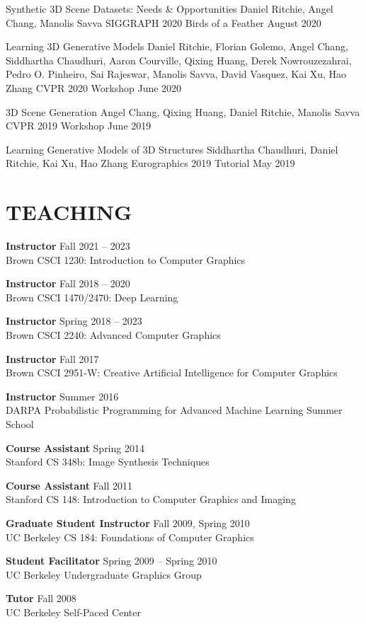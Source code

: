 \documentclass[line,margin]{res}
\begin{document}
\begin{resume}
\workshop
{Synthetic 3D Scene Datasets: Needs \& Opportunities}
{Daniel Ritchie, Angel Chang, Manolis Savva}
{SIGGRAPH 2020 Birds of a Feather}
{August 2020}

\workshop
{Learning 3D Generative Models}
{Daniel Ritchie, Florian Golemo, Angel Chang, Siddhartha Chaudhuri, Aaron Courville, Qixing Huang, Derek Nowrouzezahrai, Pedro O. Pinheiro, Sai Rajeswar, Manolis Savva, David Vasquez, Kai Xu, Hao Zhang}
{CVPR 2020 Workshop}
{June 2020}

\workshop
{3D Scene Generation}
{Angel Chang, Qixing Huang, Daniel Ritchie, Manolis Savva}
{CVPR 2019 Workshop}
{June 2019}

\tutorial
{Learning Generative Models of 3D Structures}
{Siddhartha Chaudhuri, Daniel Ritchie, Kai Xu, Hao Zhang}
{Eurographics 2019 Tutorial}
{May 2019}


\section{TEACHING}

\newcommand{\teach}[3] {
	\textbf{#1} \hfill #3\\
	#2
}

\teach
{Instructor}
{Brown CSCI 1230: Introduction to Computer Graphics}
{Fall 2021 -- 2023}

\teach
{Instructor}
{Brown CSCI 1470/2470: Deep Learning}
{Fall 2018 -- 2020}

\teach
{Instructor}
{Brown CSCI 2240: Advanced Computer Graphics}
{Spring 2018 -- 2023}

\teach
{Instructor}
{Brown CSCI 2951-W: Creative Artificial Intelligence for Computer Graphics}
{Fall 2017}

\teach
{Instructor}
{DARPA Probabilistic Programming for Advanced Machine Learning Summer School}
{Summer 2016}

\teach
{Course Assistant}
{Stanford CS 348b: Image Synthesis Techniques}
{Spring 2014}

\teach
{Course Assistant}
{Stanford CS 148: Introduction to Computer Graphics and Imaging}
{Fall 2011}

\teach
{Graduate Student Instructor}
{UC Berkeley CS 184: Foundations of Computer Graphics}
{Fall 2009, Spring 2010}

\teach
{Student Facilitator}
{UC Berkeley Undergraduate Graphics Group}
{Spring 2009 -- Spring 2010}

\teach
{Tutor}
{UC Berkeley Self-Paced Center}
{Fall 2008}


\end{resume}
\end{document}
